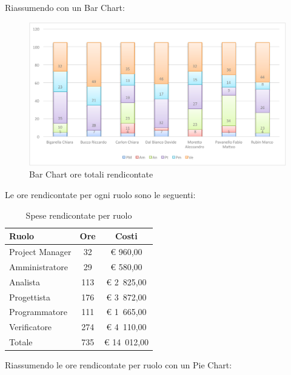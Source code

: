 			Riassumendo con un Bar Chart:
			\begin{figure}[H]\centering
				\includegraphics[width=\textwidth]{PianoDiProgetto/Pics/ChartOreRendic.pdf}
				\caption{Bar Chart ore totali rendicontate}
			\end{figure}
			Le ore rendicontate per ogni ruolo sono le seguenti:
			\begin{table}[H]
				\begin{center}
					\begin{tabular}{| l | c | c |}
						\hline
						Ruolo 				& Ore 		& Costi  \\ \hline
						
						Project Manager		& 32 		& \euro{} 960,00 	\\
						Amministratore 		& 29 		& \euro{} 580,00 	\\
						Analista	 		& 113 		& \euro{} 2~825,00 	\\
						Progettista 		& 176 		& \euro{} 3~872,00  	\\
						Programmatore		& 111 		& \euro{} 1~665,00 	\\
						Verificatore		& 274 		& \euro{} 4~110,00 	\\ \hline \hline
						
						Totale	 			& 735 		& \euro{} 14~012,00 	\\ \hline
					\end{tabular}
				\end{center}
				\caption{Spese rendicontate per ruolo}
			\end{table}
			Riassumendo le ore rendicontate per ruolo con un Pie Chart:
